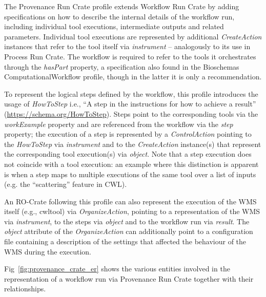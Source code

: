 \documentclass[10pt,letterpaper]{article}
\begin{document}
The Provenance Run Crate profile extends Workflow Run Crate by adding specifications on how to describe the internal details of the workflow run, including individual tool executions, intermediate outputs and related parameters.
Individual tool executions are represented by additional \emph{CreateAction} instances that refer to the tool itself via \emph{instrument} -- analogously to its use in Process Run Crate.
The workflow is required to refer to the tools it orchestrates through the \emph{hasPart} property, a specification also found in the Bioschemas ComputationalWorkflow profile, though in the latter it is only a recommendation.

To represent the logical steps defined by the workflow, this profile introduces the usage of \emph{HowToStep} i.e., “A step in the instructions for how to achieve a result” (\url{https://schema.org/HowToStep}).
Steps point to the corresponding tools via the \emph{workExample} property and are referenced from the workflow via the \emph{step} property; the execution of a step is represented by a \emph{ControlAction} pointing to the
\emph{HowToStep} via \emph{instrument} and to the \emph{CreateAction}
instance(s) that represent the corresponding tool execution(s) via
\emph{object}.
Note that a step execution does not coincide with a tool execution: an example where this distinction is apparent is when a step maps to multiple executions of the same tool over a list of inputs (e.g. the ``scattering'' feature in CWL).

An RO-Crate following this profile can also represent the execution of the WMS itself (e.g., cwltool) via
\emph{OrganizeAction}, pointing to a representation of the WMS via
\emph{instrument}, to the steps via \emph{object} and to the workflow run via \emph{result}.
The \emph{object} attribute of the
\emph{OrganizeAction} can additionally point to a configuration file containing a description of the settings that affected the behaviour of the WMS during the execution.

Fig~\ref{fig:provenance_crate_er} shows the various entities involved in the representation of a workflow run via Provenance Run Crate together with their relationships.
\end{document}
